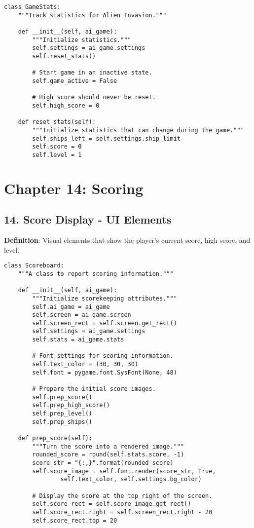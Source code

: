 \begin{lstlisting}
class GameStats:
    """Track statistics for Alien Invasion."""
    
    def __init__(self, ai_game):
        """Initialize statistics."""
        self.settings = ai_game.settings
        self.reset_stats()
        
        # Start game in an inactive state.
        self.game_active = False
        
        # High score should never be reset.
        self.high_score = 0
    
    def reset_stats(self):
        """Initialize statistics that can change during the game."""
        self.ships_left = self.settings.ship_limit
        self.score = 0
        self.level = 1
\end{lstlisting}

\section*{Chapter 14: Scoring}

\subsection*{14. Score Display - UI Elements}
\textbf{Definition}: Visual elements that show the player's current score, high score, and level.

\begin{lstlisting}
class Scoreboard:
    """A class to report scoring information."""
    
    def __init__(self, ai_game):
        """Initialize scorekeeping attributes."""
        self.ai_game = ai_game
        self.screen = ai_game.screen
        self.screen_rect = self.screen.get_rect()
        self.settings = ai_game.settings
        self.stats = ai_game.stats
        
        # Font settings for scoring information.
        self.text_color = (30, 30, 30)
        self.font = pygame.font.SysFont(None, 48)
        
        # Prepare the initial score images.
        self.prep_score()
        self.prep_high_score()
        self.prep_level()
        self.prep_ships()
    
    def prep_score(self):
        """Turn the score into a rendered image."""
        rounded_score = round(self.stats.score, -1)
        score_str = "{:,}".format(rounded_score)
        self.score_image = self.font.render(score_str, True,
                self.text_color, self.settings.bg_color)
        
        # Display the score at the top right of the screen.
        self.score_rect = self.score_image.get_rect()
        self.score_rect.right = self.screen_rect.right - 20
        self.score_rect.top = 20
\end{lstlisting}


